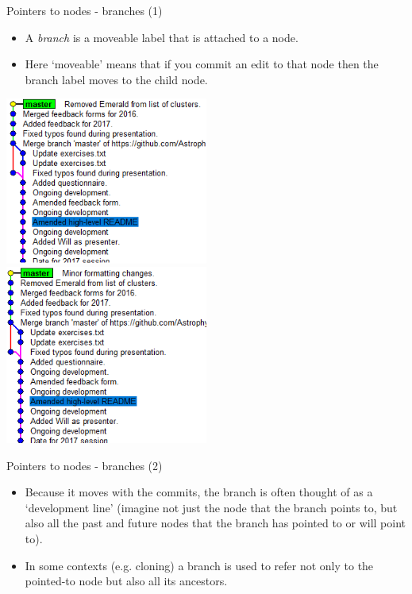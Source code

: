 \documentclass[usenames,dvipsnames]{beamer}
\begin{document}
\begin{frame}{Pointers to nodes - branches (1)}
  \begin{block}{}
    \begin{itemize}
      \item{A \textit{branch} is a moveable label that is attached to a node.}
      \item{Here `moveable' means that if you commit an edit to that node then the branch label moves to the child node.}
    \end{itemize}
  \end{block}
  \begin{block}{}
      \includegraphics[width=0.5\textwidth]{Branch_1.png}%
      \includegraphics[width=0.5\textwidth]{Branch_2.png}
  \end{block}
\end{frame}
  
\begin{frame}{Pointers to nodes - branches (2)}
  \begin{block}{}
    \begin{itemize}
      \item{Because it moves with the commits, the branch is often thought of as a `development line' (imagine not just the node that the branch points to, but also all the past and future nodes that the branch has pointed to or will point to).}
      \item{In some contexts (e.g. cloning) a branch is used to refer not only to the pointed-to node but also all its ancestors.}
    \end{itemize}
  \end{block}
\end{frame}
\end{document}
